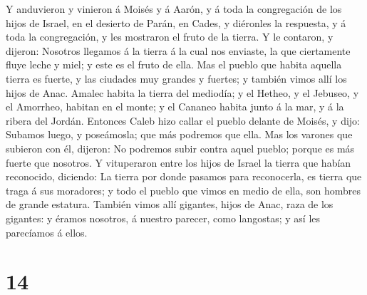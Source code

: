 Y anduvieron y vinieron á Moisés y á Aarón, y á toda la congregación de
los hijos de Israel, en el desierto de Parán, en Cades, y diéronles la
respuesta, y á toda la congregación, y les mostraron el fruto de la
tierra.  Y le contaron, y dijeron: Nosotros llegamos á la
tierra á la cual nos enviaste, la que ciertamente fluye leche y miel; y
este es el fruto de ella.  Mas el pueblo que habita aquella
tierra es fuerte, y las ciudades muy grandes y fuertes; y también vimos
allí los hijos de Anac.  Amalec habita la tierra del
mediodía; y el Hetheo, y el Jebuseo, y el Amorrheo, habitan en el monte;
y el Cananeo habita junto á la mar, y á la ribera del Jordán.
 Entonces Caleb hizo callar el pueblo delante de Moisés, y
dijo: Subamos luego, y poseámosla; que más podremos que ella.
 Mas los varones que subieron con él, dijeron: No podremos
subir contra aquel pueblo; porque es más fuerte que nosotros.
 Y vituperaron entre los hijos de Israel la tierra que
habían reconocido, diciendo: La tierra por donde pasamos para
reconocerla, es tierra que traga á sus moradores; y todo el pueblo que
vimos en medio de ella, son hombres de grande estatura. También vimos
allí gigantes, hijos de Anac, raza de los gigantes: y éramos nosotros, á
nuestro parecer, como langostas; y así les parecíamos á ellos.

\hypertarget{section-13}{%
\section{14}\label{section-13}}

